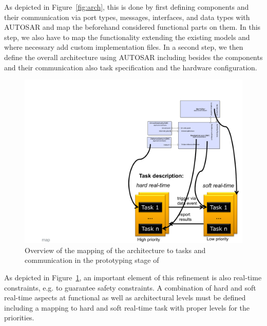 As depicted in Figure~\ref{fig:arch}, this is done by first defining components and their communication via port types, messages, interfaces, and data types with AUTOSAR and map the beforehand considered functional parts on them. In this step, we also have to map the functionality extending the existing models and where necessary add custom implementation files.
%
In a second step, we then define the overall architecture using AUTOSAR including besides the components and their communication also task specification and the hardware configuration.


\begin{figure}[!htb]
\centering
\includegraphics[scale=0.33]{figures/map.pdf}
\caption{Overview of the mapping of the architecture to tasks and communication in the prototyping stage of \cite{Broekman&Notenboom2003}}
\label{fig:map}
\end{figure}

As depicted in Figure~\ref{fig:map}, an important element of this refinement is also real-time constraints, e.g. to guarantee safety constraints. A combination of hard and soft real-time aspects at functional as well as architectural levels must be defined including a mapping to hard and soft real-time task with proper levels for the priorities.


